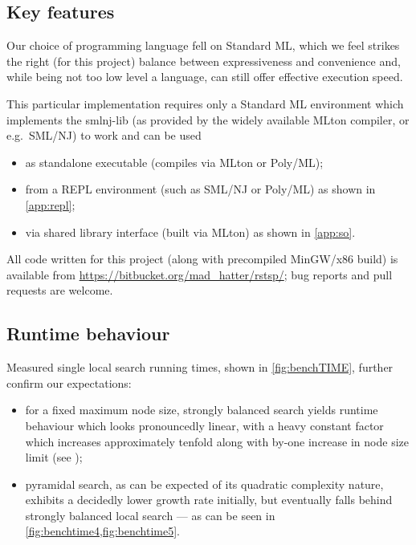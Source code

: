 \documentclass[index=totoc,bibliography=totoc]{scrartcl}
\numberwithin{equation}{section}
\numberwithin{figure}{section}
\numberwithin{table}{section}
\begin{document}
\subsection{Key features}

Our choice of programming language fell on Standard ML, which we feel
strikes the right (for this project) balance between expressiveness and
convenience and, while being not too low level a language, can still offer
effective execution speed.

This particular implementation requires only a Standard ML environment
which implements the {\ttfamily smlnj-lib}
(as provided by the widely available {\ttfamily MLton} compiler, or e.g.\ {\ttfamily SML/NJ})
to work and can be used
\begin{itemize}
  \item as standalone executable
    (compiles via {\ttfamily MLton} or {\ttfamily Poly/ML});
  \item from a REPL environment
    (such as {\ttfamily SML/NJ} or {\ttfamily Poly/ML})
    as shown in \autoref{app:repl};
  \item via shared library interface
    (built via {\ttfamily MLton}) as shown in \autoref{app:so}.
\end{itemize}

All code written for this project
(along with precompiled {\ttfamily MinGW/x86} build)
is available from \url{https://bitbucket.org/mad_hatter/rstsp/};
bug reports and pull requests are welcome.

\subsection{Runtime behaviour}

Measured single local search running times, shown in \cref{fig:benchTIME},
further confirm our expectations:

\begin{itemize}
  \item
    for a fixed maximum node size, strongly balanced search yields runtime
    behaviour which looks pronouncedly linear, with a heavy constant
    factor which increases approximately tenfold along with
    by-one increase in node size limit
    (see );
  \item
    pyramidal search, as can be expected of its quadratic complexity
    nature, exhibits a decidedly lower growth rate initially, but eventually
    falls behind strongly balanced local search --- as can be seen
    in \cref{fig:benchtime4,fig:benchtime5}.
\end{itemize}
\end{document}
